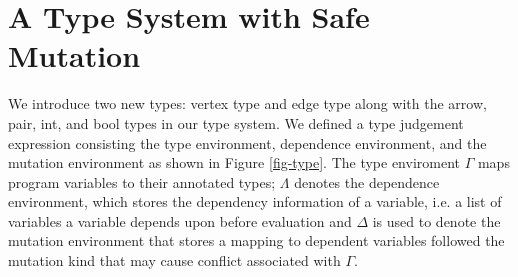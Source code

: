\section{A Type System with Safe Mutation}
\label{sec:types}

We introduce two new types: vertex type and edge type along with the
arrow, pair, int, and bool types in our type system.
We defined a type judgement expression consisting the type environment,
dependence environment, and the mutation environment as shown in Figure
\ref{fig-type}. The type enviroment $\Gamma$ maps
program variables to their annotated types; $\Lambda$ denotes the dependence
environment, which stores the dependency information of a variable, i.e. a list
of variables a variable depends upon before evaluation and $\Delta$ is used to
denote the mutation environment that stores a mapping to dependent variables
followed the mutation kind that may cause conflict associated with $\Gamma$.

